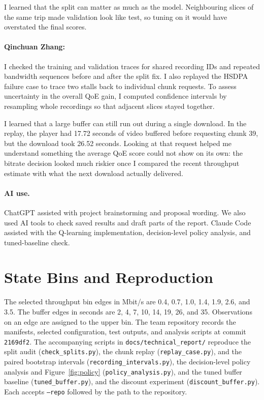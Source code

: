 \documentclass[10pt,letterpaper]{article}
\newif\ifreview
\newcommand{\reviewcolor}{\ifreview\color{reviewred}\fi}
\newcommand{\reviewtext}[1]{{\reviewcolor #1}}
\begin{document}
I learned that the split can matter as much as the model. Neighbouring slices
of the same trip made validation look like test, so tuning on it would have
overstated the final scores.

\paragraph{Qinchuan Zhang:}
I checked the training and validation traces for shared recording IDs and
repeated bandwidth sequences before and after the split fix. I also replayed
the HSDPA failure case to trace two stalls back to individual chunk requests.
To assess uncertainty in the overall QoE gain, I computed confidence intervals
by resampling whole recordings so that adjacent slices stayed together.

I learned that a large buffer can still run out during a single download. In
the replay, the player had 17.72 seconds of video buffered before requesting
chunk 39, but the download took 26.52 seconds. Looking at that request helped
me understand something the average QoE score could not show on its own: the
bitrate decision looked much riskier once I compared the recent throughput
estimate with what the next download actually delivered.

\paragraph{AI use.}
ChatGPT assisted with project brainstorming and proposal wording. We also
used AI tools to check saved results and draft parts of the report. Claude
Code assisted with the Q-learning implementation, decision-level policy
analysis, and tuned-baseline check.

\appendix
\section{State Bins and Reproduction}

The selected throughput bin edges in Mbit/s are 0.4, 0.7, 1.0, 1.4, 1.9,
2.6, and 3.5. The buffer edges in seconds are 2, 4, 7, 10, 14, 19, 26, and
35. Observations on an edge are assigned to the upper bin. The team
repository records the manifests, selected configuration, test outputs, and
analysis scripts at commit \texttt{2169df2}.
\reviewtext{The accompanying scripts in \texttt{docs/technical\_report/}
reproduce the split audit (\texttt{check\_splits.py}), the chunk replay
(\texttt{replay\_case.py}), and the paired bootstrap intervals
(\texttt{recording\_intervals.py}), the decision-level policy analysis and
Figure~\ref{fig:policy} (\texttt{policy\_analysis.py}), and the tuned buffer
baseline (\texttt{tuned\_buffer.py}), and the discount experiment
(\texttt{discount\_buffer.py}). Each accepts \texttt{--repo} followed
by the path to the repository.}
\end{document}
